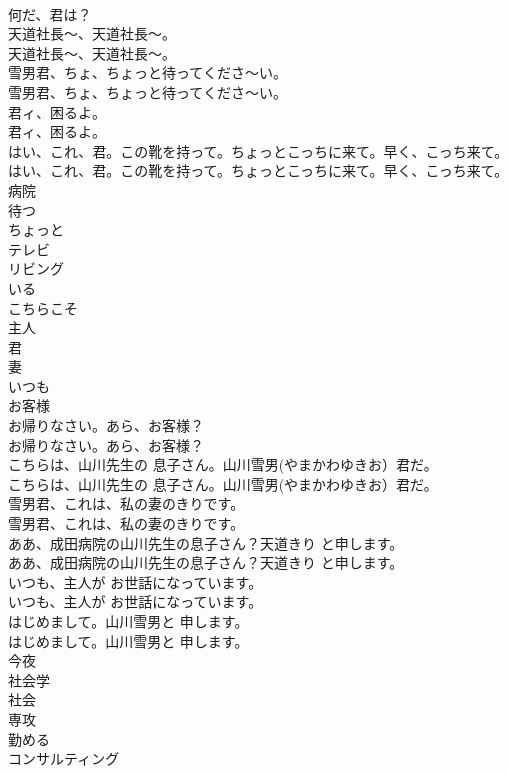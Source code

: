 \documentclass[8pt]{extreport}
\begin{document}
\begin{CJK}{UTF8}{min}
\\	何だ、君は？ 
\\	天道社長～、天道社長～。	
\\	天道社長～、天道社長～。 
\\	雪男君、ちょ、ちょっと待ってくださ～い。	
\\	雪男君、ちょ、ちょっと待ってくださ～い。 
\\	君ィ、困るよ。	
\\	君ィ、困るよ。 
\\	はい、これ、君。この靴を持って。ちょっとこっちに来て。早く、こっち来て。	
\\	はい、これ、君。この靴を持って。ちょっとこっちに来て。早く、こっち来て。 
\\	病院
\\	待つ
\\	ちょっと
\\	テレビ
\\	リビング
\\	いる
\\	こちらこそ
\\	主人
\\	君
\\	妻
\\	いつも
\\	お客様
\\	お帰りなさい。あら、お客様？	
\\	お帰りなさい。あら、お客様？ 
\\	こちらは、山川先生の 息子さん。山川雪男(やまかわゆきお）君だ。	
\\	こちらは、山川先生の 息子さん。山川雪男(やまかわゆきお）君だ。 
\\	雪男君、これは、私の妻のきりです。	
\\	雪男君、これは、私の妻のきりです。 
\\	ああ、成田病院の山川先生の息子さん？天道きり と申します。	
\\	ああ、成田病院の山川先生の息子さん？天道きり と申します。 
\\	いつも、主人が お世話になっています。	
\\	いつも、主人が お世話になっています。 
\\	はじめまして。山川雪男と 申します。	
\\	はじめまして。山川雪男と 申します。 
\\	今夜
\\	社会学
\\	社会
\\	専攻
\\	勤める
\\	コンサルティング

\end{CJK}
\end{document}
